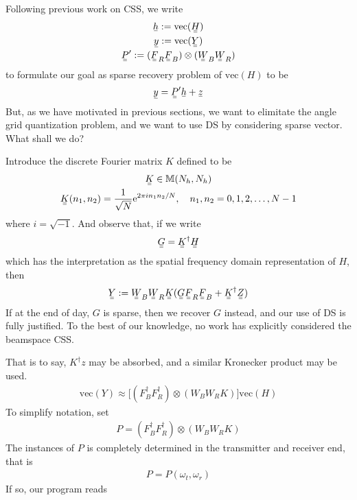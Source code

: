 \documentclass[12pt]{article}
\newcommand{\MB}[1]{\mathbb{#1}}
\newcommand{\RM}[1]{\mathrm{#1}}
\newcommand{\V}[1]{\stackunder[1.2pt]{$#1$}{\rule{.9ex}{.075ex}}}
\newcommand{\M}[1]{\V{\V{#1}}}
\begin{document}
Following previous work on CSS, we write
\begin{gather}
\V{h} := \RM{vec}(\M{H}) \\
\V{y} := \RM{vec}(\M{Y}) \\
\M{P}' :=(\M{F}_R \M{F}_B) \otimes (\M{W}_B \M{W}_R)
\end{gather}
to formulate our goal as sparse recovery problem of \(\RM{vec}(H)\) to be
\begin{gather}
\V{y} =\M{P}' \V{h} +\V{z}
\end{gather}
But, as we have motivated in previous sections, we want to elimitate the angle grid quantization problem, and we want to use DS by considering sparse vector.
What shall we do?

Introduce the discrete Fourier matrix \(K\) defined to be
\begin{gather}
\M{K} \in \MB{M}(N_h, N_h) \\
\M{K}(n_1, n_2) =\frac{1}{\sqrt{N}} \RM{e}^{2\pi i n_1 n_2 /N},
\quad n_1, n_2 =0,1,2,\dotsc, N-1
\end{gather}
where \(i =\sqrt{-1}\).
And observe that, if we write
\begin{gather}
\M{G}
=\M{K}^\dagger \M{H}
\end{gather}
which has the interpretation as the spatial frequency domain representation of \(H\), then
\begin{gather}
\M{Y}
:=\M{W}_B \M{W}_R \M{K} ( \M{G} \M{F}_R \M{F}_B +\M{K}^\dagger \M{Z} )
\end{gather}
If at the end of day, \(G\) is sparse, then we recover \(G\) instead, and our use of DS is fully justified.
To the best of our knowledge, no work has explicitly considered the beamspace CSS.

That is to say, \(K^\dagger z\) may be absorbed, and a similar Kronecker product may be used.
\begin{gather}
\RM{vec}(Y)
\approx \big[ (F_B^\dagger F_R^\dagger) \otimes (W_B W_R K) \big] \RM{vec}(H)
\end{gather}
To simplify notation, set 
\begin{gather}
P =(F_B^\dagger F_R^\dagger) \otimes (W_B W_R K)
\end{gather}
The instances of \(P\) is completely determined in the transmitter and receiver end, that is
\begin{gather}
P =P(\omega_t, \omega_r)
\end{gather}
If so, our program reads
\end{document}
